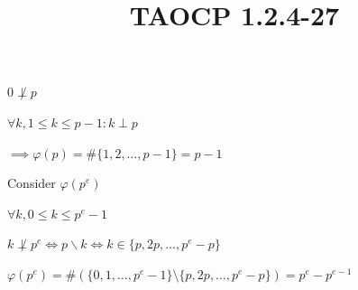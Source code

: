 \documentclass{article}
\title{TAOCP 1.2.4\mbox{-}27}
\begin{document}
\maketitle

\( 0 \not\perp p \)

\( \forall k, 1 \leq k \leq p - 1: k \perp p \)

\( \implies \varphi(p) = \#\{1,2,\ldots,p-1\} = p - 1 \)

Consider \( \varphi(p^{e}) \)

\( \forall k, 0 \leq k \leq p^{e} - 1 \)

\( k \not\perp p^{e} \iff p \backslash k \iff k \in \{ p, 2p, \ldots, p^{e} - p \} \)

\( \varphi(p^{e}) = \#(\{0,1,\ldots,p^{e}-1\} \setminus \{ p, 2p, \ldots, p^{e} - p \}) = p^{e} - p^{e-1} \)
\end{document}

